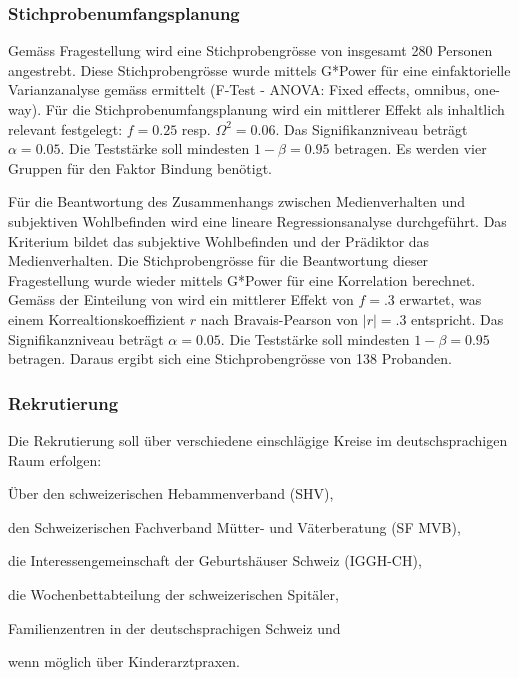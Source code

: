 \subsubsection{Stichprobenumfangsplanung}
Gemäss Fragestellung wird eine Stichprobengrösse von insgesamt 280 Personen angestrebt. Diese Stichprobengrösse wurde mittels G*Power \cite{Faul2009} für eine einfaktorielle Varianzanalyse gemäss  ermittelt (F-Test - ANOVA: Fixed effects, omnibus, one-way).
Für die Stichprobenumfangsplanung wird ein mittlerer Effekt \cite{Cohen1988a} als inhaltlich relevant festgelegt: $f = 0.25$ resp. $\Omega^2 = 0.06$. Das Signifikanzniveau beträgt $\alpha=0.05$. Die Teststärke soll mindesten $1-\beta=0.95$ betragen. Es werden vier Gruppen für den Faktor Bindung benötigt.

Für die Beantwortung des Zusammenhangs zwischen Medienverhalten und subjektiven Wohlbefinden wird eine lineare Regressionsanalyse durchgeführt. Das Kriterium bildet das subjektive Wohlbefinden und der Prädiktor das Medienverhalten. Die Stichprobengrösse für die Beantwortung dieser Fragestellung wurde wieder mittels G*Power für eine Korrelation berechnet. Gemäss der Einteilung von  wird ein mittlerer Effekt von $f=.3$ erwartet, was einem Korrealtionskoeffizient $r$ nach Bravais-Pearson von $|r|=.3$ entspricht. Das Signifikanzniveau beträgt $\alpha=0.05$. Die Teststärke soll mindesten $1-\beta=0.95$ betragen. Daraus ergibt sich eine Stichprobengrösse von 138 Probanden.    

\subsubsection{Rekrutierung}
Die Rekrutierung soll über verschiedene einschlägige Kreise im deutschsprachigen Raum erfolgen: 
\begin{seriate}
    \item Über den schweizerischen Hebammenverband (SHV),
    \item den Schweizerischen Fachverband Mütter- und Väterberatung (SF MVB),
    \item die Interessengemeinschaft der Geburtshäuser Schweiz (IGGH-CH),
    \item die Wochenbettabteilung der schweizerischen Spitäler,
    \item Familienzentren in der deutschsprachigen Schweiz und
    \item wenn möglich über Kinderarztpraxen.
\end{seriate}
